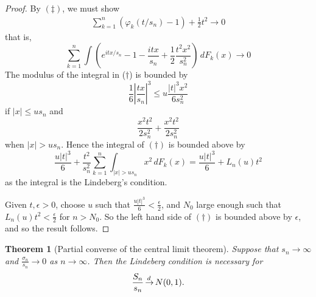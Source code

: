 \documentclass[10pt, oneside, reqno]{amsart}
\theoremstyle{plain}%
\newtheorem{thm}{Theorem}[section]
\theoremstyle{definition}
\theoremstyle{remark}
\renewcommand{\phi}{\varphi}
\def\cid{\,{\buildrel \!d \over \rightarrow}\,}
\begin{document}
\begin{proof}
    By $(\ddag)$, we must show \begin{align*}
        \sum_{k=1}^n (\phi_k(t/s_n) - 1) + \frac{1}{2} t^2 \rightarrow 0
    \end{align*} that is, \[
        \sum_{k=1}^n \int \left( e^{itx/s_n} - 1 - \frac{itx}{s_n} + \frac{1}{2} \frac{t^2 x^2}{s_n^2} \right)\, dF_k(x) \rightarrow 0  \tag{$\dagger$}
    \]  The modulus of the integral in ($\dagger$) is bounded by \[
        \frac{1}{6} \left|\frac{tx}{s_n} \right|^3 \leq u \frac{|t|^3 x^2}{6s_n^2}
    \] if $|x| \leq u s_n$ and \[
        \frac{x^2 t^2}{2s_n^2} + \frac{x^2 t^2}{2s_n^2}
    \] when $|x| > u s_n$.  Hence the integral of $(\dagger)$ is bounded above by \[
        \frac{u|t|^3}{6} + \frac{t^2}{s_n^2} \sum_{k=1}^n \int_{|x| > u s_n} x^2 \, dF_k(x) = \frac{u |t|^3}{6} + L_n(u) t^2
    \] as the integral is the Lindeberg's condition.  
    
    Given $t, \epsilon > 0$, choose $u$ such that $\frac{u |t|^3}{6} < \frac{\epsilon}{2}$, and $N_0$ large enough such that $L_n(u) t^2 < \frac{\epsilon}{2}$ for $n > N_0$.  So the left hand side of $(\dagger)$ is bounded above by $\epsilon$, and so the result follows.  
\end{proof}

\begin{thm}[Partial converse of the central limit theorem]
    Suppose that $s_n \rightarrow \infty$ and $\frac{\sigma_n}{s_n} \rightarrow 0$ as $n \rightarrow \infty$.  Then the Lindeberg condition is necessary for \[
        \frac{S_n}{s_n} \cid N(0, 1).
    \]
\end{thm}
\end{document}
